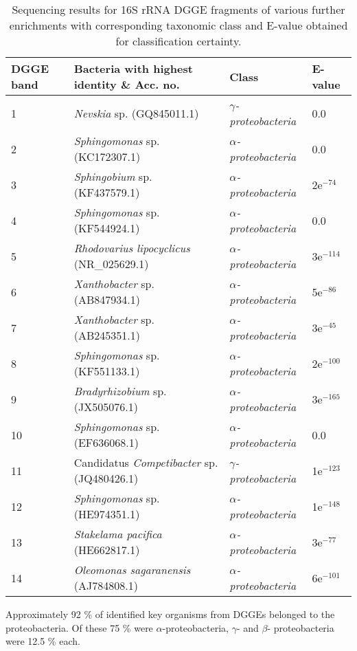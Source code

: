 \documentclass[twoside]{article}
\begin{document}
\begin{table}
\caption{Sequencing results for 16S rRNA DGGE fragments of various further enrichments with corresponding taxonomic class and E-value obtained for classification certainty.}
\begin{tabular}{ | l | p{7.8cm} | p{3cm} | l | }
\hline
DGGE band & Bacteria with highest identity \& Acc. no. & Class & E-value \\
\hline
1 & \emph{Nevskia} sp. (GQ845011.1) & \emph{$\gamma$-proteobacteria} & 0.0  \\
\hline
2 & \emph{Sphingomonas} sp. (KC172307.1) & \emph{$\alpha$-proteobacteria} & 0.0 \\
\hline
3 & \emph{Sphingobium} sp. (KF437579.1) & \emph{$\alpha$-proteobacteria} & 2e$^{-74}$ \\
\hline
4 & \emph{Sphingomonas} sp. (KF544924.1) & \emph{$\alpha$-proteobacteria} & 0.0  \\
\hline
5 & \emph{Rhodovarius lipocyclicus} (NR\_025629.1) & \emph{$\alpha$-proteobacteria} & 3e$^{-114}$ \\
\hline
6 & \emph{Xanthobacter} sp. (AB847934.1) & \emph{$\alpha$-proteobacteria} & 5e$^{-86}$  \\
\hline
7 & \emph{Xanthobacter} sp. (AB245351.1) & \emph{$\alpha$-proteobacteria} & 3e$^{-45}$  \\
\hline
8 & \emph{Sphingomonas} sp.(KF551133.1) & \emph{$\alpha$-proteobacteria} & 2e$^{-100}$  \\
\hline
9 & \emph{Bradyrhizobium} sp. (JX505076.1) & \emph{$\alpha$-proteobacteria} & 3e$^{-165}$  \\
\hline
10 & \emph{Sphingomonas} sp. (EF636068.1) & \emph{$\alpha$-proteobacteria} & 0.0  \\
\hline
11 & Candidatus \emph{Competibacter} sp. (JQ480426.1) & \emph{$\gamma$-proteobacteria} & 1e$^{-123}$  \\
\hline
12 & \emph{Sphingomonas} sp. (HE974351.1) & \emph{$\alpha$-proteobacteria} &  1e$^{-148}$ \\
\hline
13 & \emph{Stakelama pacifica} (HE662817.1) & \emph{$\alpha$-proteobacteria} & 3e$^{-77}$  \\
\hline
14 & \emph{Oleomonas sagaranensis} (AJ784808.1) & \emph{$\alpha$-proteobacteria} & 6e$^{-101}$  \\
\hline
\end{tabular}

\end{table}
\FloatBarrier
Approximately 92 \% of identified key organisms from DGGEs belonged to the proteobacteria. Of these 75 \% were \emph{$\alpha$}-proteobacteria, \emph{$\gamma$}- and \emph{$\beta$}- proteobacteria were 12.5 \% each.
\end{document}
